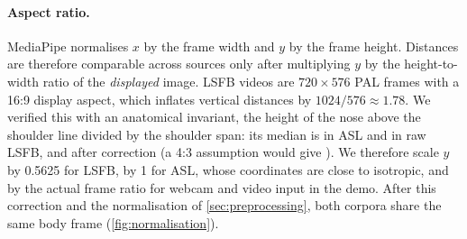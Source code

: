 \paragraph{Aspect ratio.}
MediaPipe normalises $x$ by the frame width and $y$ by the frame height. Distances are therefore
comparable across sources only after multiplying $y$ by the height-to-width ratio of the
\emph{displayed} image. LSFB videos are $720\times576$ PAL frames with a 16:9 display aspect, which
inflates vertical distances by $1024/576\approx1.78$. We verified this with an anatomical
invariant, the height of the nose above the shoulder line divided by the shoulder span: its median
is \numNoseAsl{} in ASL and \numNoseLsfbRaw{} in raw LSFB, and \numNoseLsfbCorr{} after correction
(a 4:3 assumption would give \numNoseLsfbFourThree{}).
We therefore scale $y$ by 0.5625 for LSFB, by 1 for ASL, whose coordinates are close to isotropic,
and by the actual frame ratio for webcam and video input in the demo. After this correction and
the normalisation of \cref{sec:preprocessing}, both corpora share the same body frame
(\cref{fig:normalisation}).

